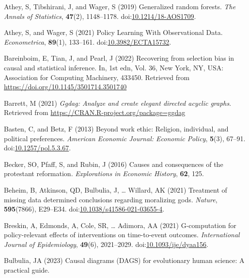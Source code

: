 \documentclass[
  singlecolumn,
  9pt]{article}
\begin{document}
\begin{CSLReferences}
Athey, S, Tibshirani, J, and Wager, S (2019) Generalized random forests.
\emph{The Annals of Statistics}, \textbf{47}(2), 1148--1178.
doi:\href{https://doi.org/10.1214/18-AOS1709}{10.1214/18-AOS1709}.

Athey, S, and Wager, S (2021) Policy Learning With Observational Data.
\emph{Econometrica}, \textbf{89}(1), 133--161.
doi:\href{https://doi.org/10.3982/ECTA15732}{10.3982/ECTA15732}.

Bareinboim, E, Tian, J, and Pearl, J (2022) Recovering from selection
bias in causal and statistical inference. In, 1st edn, Vol. 36, New
York, NY, USA: Association for Computing Machinery, 433450. Retrieved
from \url{https://doi.org/10.1145/3501714.3501740}

Barrett, M (2021) \emph{Ggdag: Analyze and create elegant directed
acyclic graphs}. Retrieved from
\url{https://CRAN.R-project.org/package=ggdag}

Basten, C, and Betz, F (2013) Beyond work ethic: Religion, individual,
and political preferences. \emph{American Economic Journal: Economic
Policy}, \textbf{5}(3), 67--91.
doi:\href{https://doi.org/10.1257/pol.5.3.67}{10.1257/pol.5.3.67}.

Becker, SO, Pfaff, S, and Rubin, J (2016) Causes and consequences of the
protestant reformation. \emph{Explorations in Economic History},
\textbf{62}, 125.

Beheim, B, Atkinson, QD, Bulbulia, J, \ldots{} Willard, AK (2021)
Treatment of missing data determined conclusions regarding moralizing
gods. \emph{Nature}, \textbf{595}(7866), E29--E34.
doi:\href{https://doi.org/10.1038/s41586-021-03655-4}{10.1038/s41586-021-03655-4}.

Breskin, A, Edmonds, A, Cole, SR, \ldots{} Adimora, AA (2021)
G-computation for policy-relevant effects of interventions on
time-to-event outcomes. \emph{International Journal of Epidemiology},
\textbf{49}(6), 2021--2029.
doi:\href{https://doi.org/10.1093/ije/dyaa156}{10.1093/ije/dyaa156}.

Bulbulia, JA (2023) Causal diagrams (DAGS) for evolutionary human
science: A practical guide.


\end{CSLReferences}
\end{document}
